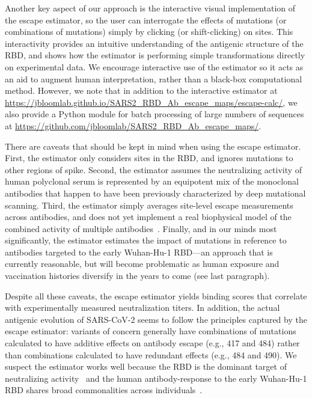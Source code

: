 \documentclass[9pt,twocolumn,twoside]{gsajnl_modified}
\begin{document}
Another key aspect of our approach is the interactive visual implementation of the escape estimator, so the user can interrogate the effects of mutations (or combinations of mutations) simply by clicking (or shift-clicking) on sites.
This interactivity provides an intuitive understanding of the antigenic structure of the RBD, and shows how the estimator is performing simple transformations directly on experimental data.
We encourage interactive use of the estimator so it acts as an aid to augment human interpretation, rather than a black-box computational method.
However, we note that in addition to the interactive estimator at \url{https://jbloomlab.github.io/SARS2_RBD_Ab_escape_maps/escape-calc/}, we also provide a Python module for batch processing of large numbers of sequences at \url{https://github.com/jbloomlab/SARS2_RBD_Ab_escape_maps/}.

There are caveats that should be kept in mind when using the escape estimator.
First, the estimator only considers sites in the RBD, and ignores mutations to other regions of spike.
Second, the estimator assumes the neutralizing activity of human polyclonal serum is represented by an equipotent mix of the monoclonal antibodies that happen to have been previously characterized by deep mutational scanning.
Third, the estimator simply averages site-level escape measurements across antibodies, and does not yet implement a real biophysical model of the combined activity of multiple antibodies~\citep{einav2020two}.
Finally, and in our minds most significantly, the estimator estimates the impact of mutations in reference to antibodies targeted to the early Wuhan-Hu-1 RBD---an approach that is currently reasonable, but will become problematic as human exposure and vaccination histories diversify in the years to come (see last paragraph).

Despite all these caveats, the escape estimator yields binding scores that correlate with experimentally measured neutralization titers.
In addition, the actual antigenic evolution of SARS-CoV-2 seems to follow the principles captured by the escape estimator: variants of concern generally have combinations of mutations calculated to have additive effects on antibody escape (e.g., 417 and 484) rather than combinations calculated to have redundant effects (e.g., 484 and 490).
We suspect the estimator works well because the RBD is the dominant target of neutralizing activity~\citep{piccoli2020mapping,greaney2021comprehensive,schmidt2021high} and the human antibody-response to the early Wuhan-Hu-1 RBD shares broad commonalities across individuals~\citep{yuan2020structural,robbiani2020convergent,greaney2021comprehensive,greaney2021mapping,chen2021convergent}.
\end{document}
